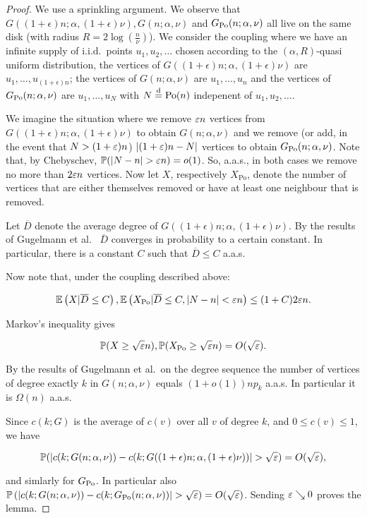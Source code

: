 \begin{proof}
We use a sprinkling argument. 
We observe that $G((1+\epsilon)n;\alpha,(1+\epsilon)\nu), G(n;\alpha,\nu)$ 
and $G_{\text{Po}}(n;\alpha,\nu)$ all live on the same disk (with radius $R = 2\log\left(\frac{n}{\nu}\right)$).
We consider the coupling where we have an infinite supply of i.i.d.~points $u_1, u_2, \dots$ chosen according
to the $(\alpha,R)$-quasi uniform distribution, the vertices of $G((1+\epsilon)n;\alpha,(1+\epsilon)\nu)$
are $u_1,\dots, u_{(1+\epsilon)n}$; the vertices of $G(n;\alpha,\nu)$ are $u_1,\dots, u_n$ and 
the vertices of $G_{\text{Po}}(n;\alpha,\nu)$ are $u_1,\dots, u_N$ with $N\stackrel{\text{d}}{=} {\mathrm{Po}}(n)$ indepenent of
$u_1, u_2, \dots$.

We imagine the situation where we remove $\varepsilon n$ vertices from $G((1+\epsilon)n;\alpha,(1+\epsilon)\nu)$ to obtain
$G(n;\alpha,\nu)$ and we remove (or add, in the event that $N > (1+\varepsilon)n$) $|(1+\varepsilon)n - N|$ vertices to obtain $G_{\text{Po}}(n;\alpha,\nu)$.
Note that, by Chebyschev, $\mathbb{P}( |N-n| > \varepsilon n ) = o(1)$. So, a.a.s., in both cases we remove no more than $2\varepsilon n$ vertices.
Now let $X$, respectively $X_{\text{Po}}$, denote the number of vertices that are either themselves removed or have at least one 
neighbour that is removed.

Let $\overline{D}$ denote the average degree of $G((1+\epsilon)n;\alpha,(1+\epsilon)\nu)$.
By the results of Gugelmann et al.~\cite{gugelmann2012random} $\overline{D}$ converges in probability
to a certain constant. In particular, there is a constant $C$ such that $\overline{D} \leq C$ a.a.s.

Now note that, under the coupling described above:

$$ {\mathbb E}\left( X | \overline{D} \leq C \right),  {\mathbb E}\left( X_{\text{Po}} | \overline{D} \leq C, |N-n|<\varepsilon n \right) \leq (1+C)  2 \varepsilon n. $$ 

Markov's inequality gives

$$ \mathbb{P}( X \geq \sqrt{\varepsilon} n ), \mathbb{P}( X_{\text{Po}} \geq \sqrt{\varepsilon} n ) = O( \sqrt{\varepsilon} ). $$

By the results of Gugelmann et al.~on the degree sequence the number of vertices of degree exactly
$k$ in $G(n;\alpha,\nu)$ equals $(1+o(1)) n p_k$ a.a.s.
In particular it is $\Omega(n)$ a.a.s.

Since $c(k;G)$ is the average of $c(v)$ over all $v$ of degree $k$, and $0\leq c(v)\leq 1$, we have

$$ \mathbb{P}( |c(k;G(n;\alpha,\nu)) - c(k;G((1+\epsilon)n;\alpha,(1+\epsilon)\nu))| > \sqrt{\varepsilon} ) = O(\sqrt{\varepsilon}), $$

and simlarly for $G_{\text{Po}}$. In particular also 
$\mathbb{P}\left(|c(k;G(n;\alpha,\nu)) - c(k;G_{\text{Po}}(n;\alpha,\nu))| > \sqrt{\varepsilon} \right) = O(\sqrt{\varepsilon})$.
Sending $\varepsilon\searrow 0$ proves the lemma. 
\end{proof}


